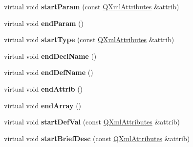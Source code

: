 \begin{DoxyCompactItemize}
\item 
\hypertarget{class_param_handler_a0adc3c16cf5e35e11e1ef98e905b91e8}{virtual void {\bfseries start\-Param} (const \hyperlink{class_q_xml_attributes}{Q\-Xml\-Attributes} \&attrib)}\label{class_param_handler_a0adc3c16cf5e35e11e1ef98e905b91e8}

\item 
\hypertarget{class_param_handler_a79170d1fb476ff121b6b0aea57b409e4}{virtual void {\bfseries end\-Param} ()}\label{class_param_handler_a79170d1fb476ff121b6b0aea57b409e4}

\item 
\hypertarget{class_param_handler_ae14fe251be3b5f4a32cd4cd60c4ff4f0}{virtual void {\bfseries start\-Type} (const \hyperlink{class_q_xml_attributes}{Q\-Xml\-Attributes} \&attrib)}\label{class_param_handler_ae14fe251be3b5f4a32cd4cd60c4ff4f0}

\item 
\hypertarget{class_param_handler_a87e2681d13876256dd01efba8d29e618}{virtual void {\bfseries end\-Decl\-Name} ()}\label{class_param_handler_a87e2681d13876256dd01efba8d29e618}

\item 
\hypertarget{class_param_handler_a068c1f937c274d410b426ac9cd943525}{virtual void {\bfseries end\-Def\-Name} ()}\label{class_param_handler_a068c1f937c274d410b426ac9cd943525}

\item 
\hypertarget{class_param_handler_ae161b8434a2fd7bff28ea2979175a925}{virtual void {\bfseries end\-Attrib} ()}\label{class_param_handler_ae161b8434a2fd7bff28ea2979175a925}

\item 
\hypertarget{class_param_handler_a7cb0f0ea937e79872a676b04b63c20b2}{virtual void {\bfseries end\-Array} ()}\label{class_param_handler_a7cb0f0ea937e79872a676b04b63c20b2}

\item 
\hypertarget{class_param_handler_ab8613d036d968b0a68c4eea3969a9cd6}{virtual void {\bfseries start\-Def\-Val} (const \hyperlink{class_q_xml_attributes}{Q\-Xml\-Attributes} \&attrib)}\label{class_param_handler_ab8613d036d968b0a68c4eea3969a9cd6}

\item 
\hypertarget{class_param_handler_a104aa450d7ed98aaaf929bf81eb3252e}{virtual void {\bfseries start\-Brief\-Desc} (const \hyperlink{class_q_xml_attributes}{Q\-Xml\-Attributes} \&attrib)}\label{class_param_handler_a104aa450d7ed98aaaf929bf81eb3252e}


\end{DoxyCompactItemize}
